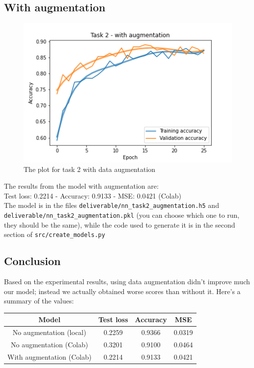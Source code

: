 \documentclass[11pt]{scrartcl}
\begin{document}
	\subsection*{With augmentation}

		\begin{figure}[H]
			\centering
			\includegraphics[width=\textwidth]{src/plot_task2_augmentation.png}
			\caption{The plot for task 2 with data  augmentation}
			\label{fig:plot_T2_2}
		\end{figure}

		The results from the model with augmentation are:\\
		
		Test loss: 0.2214 - Accuracy: 0.9133 - MSE: 0.0421 (Colab)\\

		The model is in the files \texttt{deliverable/nn\_task2\_augmentation.h5} and\\ 
		\texttt{deliverable/nn\_task2\_augmentation.pkl} (you can choose which one to run, they should be the same), while the code used to generate 
		it is in the second section of \texttt{src/create\_models.py}\\


	\newpage
	\subsection*{Conclusion}

		Based on the experimental results, using data augmentation didn't improve much our model; instead we actually obtained worse scores than without it. Here's a summary of the values:

		\begin{table}[H]
			\centering
			\begin{tabular}{cccc}
				Model & Test loss & Accuracy & MSE\\
				\hline
				No augmentation (local) & 0.2259 & 0.9366 & 0.0319\\
				No augmentation (Colab) & 0.3201 & 0.9100 & 0.0464\\
				With augmentation (Colab) & 0.2214 & 0.9133 & 0.0421
			\end{tabular}
		\end{table}
\end{document}
